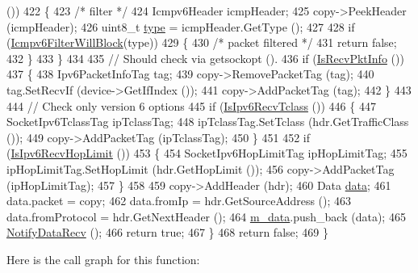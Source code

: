 \begin{DoxyCode}
       ())
422         \{
423           \textcolor{comment}{/* filter */}
424           Icmpv6Header icmpHeader;
425           copy->PeekHeader (icmpHeader);
426           uint8\_t \hyperlink{visualizer-ideas_8txt_add98db9e15e2a58cf2b57623e7aa893a}{type} = icmpHeader.GetType ();
427 
428           \textcolor{keywordflow}{if} (\hyperlink{classns3_1_1Ipv6RawSocketImpl_a033c506bc14bddc3f9ef47bc71efa328}{Icmpv6FilterWillBlock}(type))
429             \{
430               \textcolor{comment}{/* packet filtered */}
431               \textcolor{keywordflow}{return} \textcolor{keyword}{false};
432             \}
433         \}
434 
435       \textcolor{comment}{// Should check via getsockopt ().}
436       \textcolor{keywordflow}{if} (\hyperlink{classns3_1_1Socket_a104a42cdf0290b4e8867b4c0a77aadc2}{IsRecvPktInfo} ())
437         \{
438           Ipv6PacketInfoTag tag;
439           copy->RemovePacketTag (tag);
440           tag.SetRecvIf (device->GetIfIndex ());
441           copy->AddPacketTag (tag);
442         \}
443 
444       \textcolor{comment}{// Check only version 6 options}
445       \textcolor{keywordflow}{if} (\hyperlink{classns3_1_1Socket_ad9b8d1ceb1e0b80609b7c6a1c1392eec}{IsIpv6RecvTclass} ())
446         \{
447           SocketIpv6TclassTag ipTclassTag;
448           ipTclassTag.SetTclass (hdr.GetTrafficClass ());
449           copy->AddPacketTag (ipTclassTag);
450         \}
451 
452       \textcolor{keywordflow}{if} (\hyperlink{classns3_1_1Socket_a99fb541eff485b5b2c6fa7f0aac3abb9}{IsIpv6RecvHopLimit} ())
453         \{
454           SocketIpv6HopLimitTag ipHopLimitTag;
455           ipHopLimitTag.SetHopLimit (hdr.GetHopLimit ());
456           copy->AddPacketTag (ipHopLimitTag);
457         \}
458 
459       copy->AddHeader (hdr);
460       Data \hyperlink{topology-example-sim_8cc_a26c65296e316af77b787dc77469bb2a4}{data};
461       data.packet = copy;
462       data.fromIp = hdr.GetSourceAddress ();
463       data.fromProtocol = hdr.GetNextHeader ();
464       \hyperlink{classns3_1_1Ipv6RawSocketImpl_ae01fe78981765eec9f036e4cd657c73a}{m\_data}.push\_back (data);
465       \hyperlink{classns3_1_1Socket_a91fa3046bbd0a7644381f1d2481bdfef}{NotifyDataRecv} ();
466       \textcolor{keywordflow}{return} \textcolor{keyword}{true};
467     \}
468   \textcolor{keywordflow}{return} \textcolor{keyword}{false};
469 \}
\end{DoxyCode}


Here is the call graph for this function\+:


